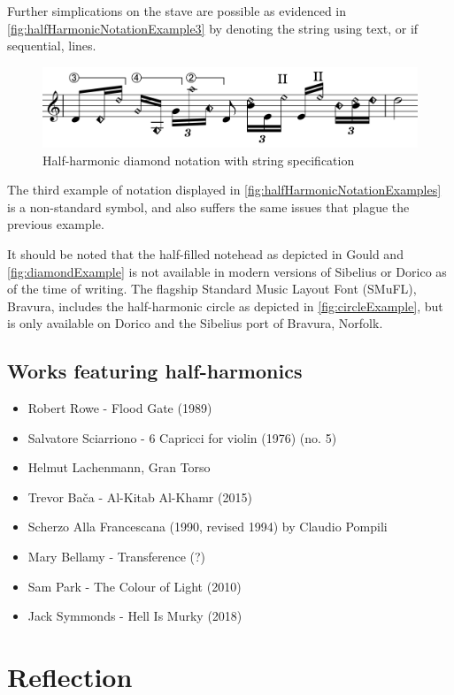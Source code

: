 Further simplications on the stave are possible as evidenced in \autoref{fig:halfHarmonicNotationExample3} by denoting the string using text, or if sequential, lines.

\begin{figure}
    \includegraphics[width=\linewidth]{./resources/halfHarmonicNotationExample3.pdf}
    \caption{Half-harmonic diamond notation with string specification} \label{fig:halfHarmonicNotationExample3}
  \end{figure}

The third example of notation displayed in \autoref{fig:halfHarmonicNotationExamples} is a non-standard symbol, and also suffers the same issues that plague the previous example.

It should be noted that the half-filled notehead as depicted in Gould and \autoref{fig:diamondExample} is not available in modern versions of Sibelius or Dorico as of the time of writing.\autocite[424]{gouldBars2011}
The flagship Standard Music Layout Font (SMuFL), Bravura, includes the half-harmonic circle as depicted in \autoref{fig:circleExample}, but is only available on Dorico and the Sibelius port of Bravura, Norfolk.\autocite[]{w3ccommitteeStandardMusicFont2019}

\subsection{Works featuring half-harmonics} \label{sec:half-harmonicsLiterature}

\begin{itemize}
    \item Robert Rowe - Flood Gate (1989)
    \item Salvatore Sciarriono - 6 Capricci for violin (1976) (no. 5)
    \item Helmut Lachenmann, Gran Torso
    \item Trevor Bača - Al-Kitab Al-Khamr (2015)
    \item Scherzo Alla Francescana (1990, revised 1994) by Claudio Pompili 
    \item Mary Bellamy - Transference (?)
    \item Sam Park - The Colour of Light (2010)
    \item Jack Symmonds - Hell Is Murky (2018)
\end{itemize}

\section{Reflection}




\lipsum[4]
